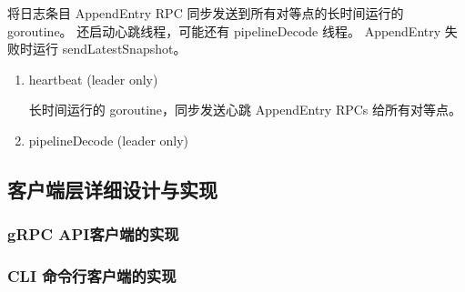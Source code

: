 \begin{enumerate}
				将日志条目 AppendEntry RPC 同步发送到所有对等点的长时间运行的 goroutine。 还启动心跳线程，可能还有 pipelineDecode 线程。 AppendEntry 失败时运行 sendLatestSnapshot。
				
				\begin{enumerate}
				
					\item heartbeat (leader only) 
					
					长时间运行的 goroutine，同步发送心跳 AppendEntry RPCs 给所有对等点。


					
					\item pipelineDecode (leader only)
					
				\end{enumerate}

			\end{enumerate}

  	\subsection{客户端层详细设计与实现}
  		
		\subsubsection{gRPC API客户端的实现}
		\subsubsection{CLI 命令行客户端的实现}
		

    
 \clearpage